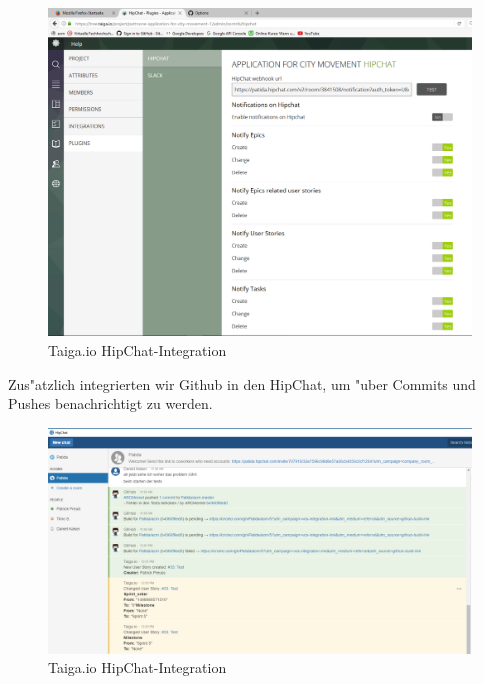 \documentclass[a4paper, 11pt]{scrreprt}
\begin{document}
\begin{figure} [H]
\begin{center}

\includegraphics[width=16cm]{hipchat.png}
\caption{Taiga.io HipChat-Integration}

\end{center}
\end{figure}

Zus"atzlich integrierten wir Github in den HipChat, um "uber Commits und Pushes benachrichtigt zu werden.

\begin{figure} [H]
\begin{center}


\includegraphics[width=16cm]{info_taiga_github_hipchat.png}
\caption{Taiga.io HipChat-Integration}

\end{center}
\end{figure}
\end{document}
